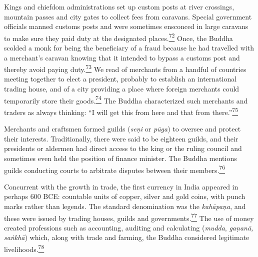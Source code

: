 Kings and chiefdom administrations set up custom posts at river
crossings, mountain passes and city gates to collect fees from caravans.
Special government officials manned customs posts and were sometimes
ensconced in large caravans to make sure they paid duty at the
designated
places.\label{footprints_split_006.html_fnref72}\hyperref[footprints_split_024.htmlux5cux23fn72]{\textsuperscript{72}}
Once, the Buddha scolded a monk for being the beneficiary of a fraud
because he had travelled with a merchant's caravan knowing that it
intended to bypass a customs post and thereby avoid paying
duty.\label{footprints_split_006.html_fnref73}\hyperref[footprints_split_024.htmlux5cux23fn73]{\textsuperscript{73}}
We read of merchants from a handful of countries meeting together to
elect a president, probably to establish an international trading house,
and of a city providing a place where foreign merchants could
temporarily store their
goods.\label{footprints_split_006.html_fnref74}\hyperref[footprints_split_024.htmlux5cux23fn74]{\textsuperscript{74}}
The Buddha characterized such merchants and traders as always thinking:
``I will get this from here and that from
there.''\label{footprints_split_006.html_fnref75}\hyperref[footprints_split_024.htmlux5cux23fn75]{\textsuperscript{75}}

Merchants and craftsmen formed guilds (\emph{seṇi} or \emph{pūga}) to
oversee and protect their interests. Traditionally, there were said to
be eighteen guilds, and their presidents or aldermen had direct access
to the king or the ruling council and sometimes even held the position
of finance minister. The Buddha mentions guilds conducting courts to
arbitrate disputes between their
members.\label{footprints_split_006.html_fnref76}\hyperref[footprints_split_024.htmlux5cux23fn76]{\textsuperscript{76}}

Concurrent with the growth in trade, the first currency in India
appeared in perhaps 600 BCE: countable units of copper, silver and gold
coins, with punch marks rather than legends. The standard denomination
was the \emph{kahāpaṇa}, and these were issued by trading houses, guilds
and
governments.\label{footprints_split_006.html_fnref77}\hyperref[footprints_split_024.htmlux5cux23fn77]{\textsuperscript{77}}
The use of money created professions such as accounting, auditing and
calculating (\emph{mudda}, \emph{gaṇanā, saṅkhā}) which, along with
trade and farming, the Buddha considered legitimate
livelihoods.\label{footprints_split_006.html_fnref78}\hyperref[footprints_split_024.htmlux5cux23fn78]{\textsuperscript{78}}


